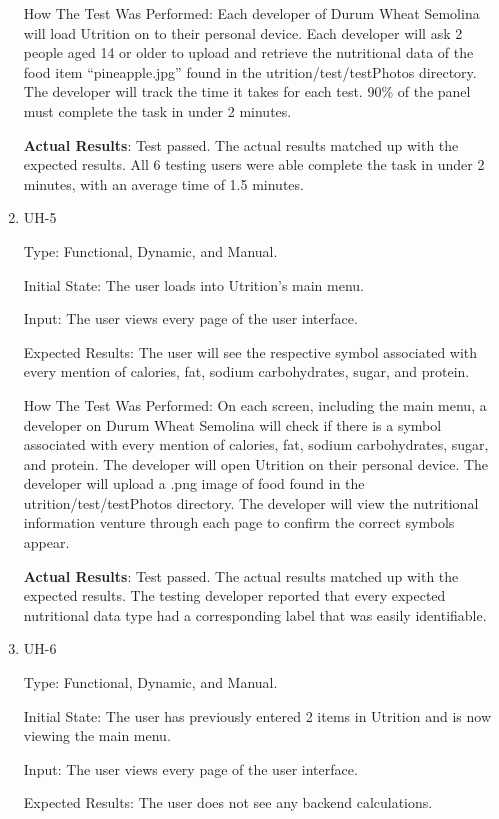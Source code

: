\documentclass[12pt, titlepage]{article}
\begin{document}
\begin{enumerate}
		How The Test Was Performed: Each developer of Durum Wheat Semolina will load Utrition on to their personal device. Each developer will ask 2 people aged 14 or older to upload and retrieve the nutritional data of the food item “pineapple.jpg” found in the utrition/test/testPhotos directory. The developer will track the time it takes for each test. 90\% of the panel must complete the task in under 2 minutes.
		
		\textbf{Actual Results}: Test passed. The actual results matched up with the expected results. All 6 testing users were able complete the task in under 2 minutes, with an average time of 1.5 minutes.
		
		\item{UH-5}
		
		Type: Functional, Dynamic, and Manual.
		
		Initial State: The user loads into Utrition’s main menu.
		
		Input: The user views every page of the user interface.
		
		Expected Results: The user will see the respective symbol associated with every mention of calories, fat, sodium carbohydrates, sugar, and protein.
		
		How The Test Was Performed: On each screen, including the main menu, a developer on Durum Wheat Semolina will check if there is a symbol associated with every mention of calories, fat, sodium carbohydrates, sugar, and protein. The developer will open Utrition on their personal device. The developer will upload a .png image of food found in the utrition/test/testPhotos directory. The developer will view the nutritional information venture through each page to confirm the correct symbols appear.
		
		\textbf{Actual Results}: Test passed. The actual results matched up with the expected results. The testing developer reported that every expected nutritional data type had a corresponding label that was easily identifiable.
		
		\item{UH-6}
		
		Type: Functional, Dynamic, and Manual.
		
		Initial State: The user has previously entered 2 items in Utrition and is now viewing the main menu.
		
		Input: The user views every page of the user interface.
		
		Expected Results: The user does not see any backend calculations.
		

\end{enumerate}
\end{document}
